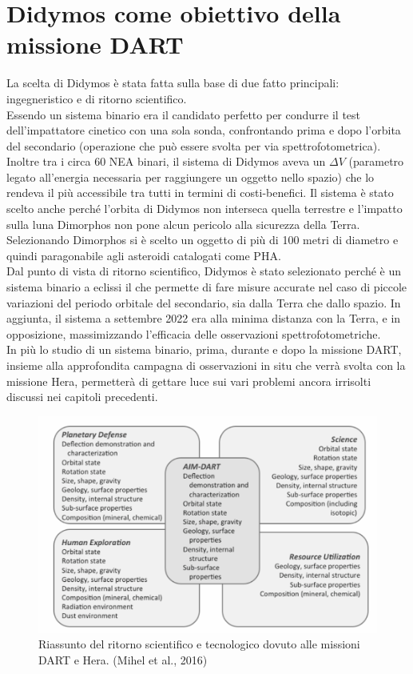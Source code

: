 \documentclass[a4paper,11pt,openright]{book}
\begin{document}
\section{Didymos come obiettivo della missione DART}
La scelta di Didymos è stata fatta sulla base di due fatto principali: ingegneristico e di ritorno scientifico.\\
Essendo un sistema binario era il candidato perfetto per condurre il test dell'impattatore cinetico con una sola sonda, confrontando prima e dopo l'orbita del secondario (operazione che può essere svolta per via spettrofotometrica). Inoltre tra i circa 60 NEA binari, il sistema di Didymos aveva un $\Delta V$ (parametro legato all'energia necessaria per raggiungere un oggetto nello spazio) che lo rendeva il più accessibile tra tutti in termini di costi-benefici. Il sistema è stato scelto anche perché l'orbita di Didymos non interseca quella terrestre e l'impatto sulla luna Dimorphos non pone alcun pericolo alla sicurezza della Terra. Selezionando Dimorphos si è scelto un oggetto di più di 100 metri di diametro e quindi paragonabile agli asteroidi catalogati come PHA.\\
Dal punto di vista di ritorno scientifico, Didymos è stato selezionato perché è un sistema binario a eclissi il che permette di fare misure accurate nel caso di piccole variazioni del periodo orbitale del secondario, sia dalla Terra che dallo spazio. In aggiunta, il sistema a settembre 2022 era alla minima distanza con la Terra, e in opposizione, massimizzando l'efficacia delle osservazioni spettrofotometriche.\\
In più lo studio di un sistema binario, prima, durante e dopo la missione DART, insieme alla approfondita campagna di osservazioni in situ che verrà svolta con la missione Hera, permetterà di gettare luce sui vari problemi ancora irrisolti discussi nei capitoli precedenti.

\begin{figure}[!h]
    \centering
    \includegraphics[width=\textwidth]{figure/Michel et al.png}
    \caption[Riassunto del ritorno scientifico e tecnologico dovuto alle missioni DART e Hera.]{Riassunto del ritorno scientifico e tecnologico dovuto alle missioni DART e Hera. (Mihel et al., 2016)}
    \label{fig:ritorno_scientifico}
\end{figure}
\end{document}
